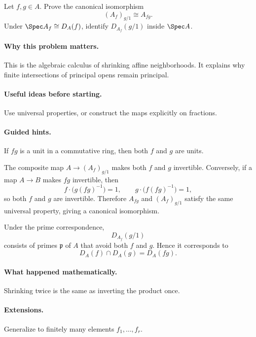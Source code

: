 \begin{problem}
Let $f,g\in A$.  Prove the canonical isomorphism
\[
(A_f)_{g/1}\cong A_{fg}.
\]
Under $\Spec A_f\cong D_A(f)$, identify $D_{A_f}(g/1)$ inside $\Spec A$.
\end{problem}

\paragraph{Why this problem matters.}
This is the algebraic calculus of shrinking affine neighborhoods.  It explains why finite
intersections of principal opens remain principal.

\paragraph{Useful ideas before starting.}
Use universal properties, or construct the maps explicitly on fractions.

\paragraph{Guided hints.}
If $fg$ is a unit in a commutative ring, then both $f$ and $g$ are units.

\begin{solution}
The composite map $A\to(A_f)_{g/1}$ makes both $f$ and $g$ invertible.  Conversely, if a
map $A\to B$ makes $fg$ invertible, then
\[
f\cdot\bigl(g(fg)^{-1}\bigr)=1,
\qquad
g\cdot\bigl(f(fg)^{-1}\bigr)=1,
\]
so both $f$ and $g$ are invertible.  Therefore $A_{fg}$ and $(A_f)_{g/1}$ satisfy the same
universal property, giving a canonical isomorphism.

Under the prime correspondence,
\[
D_{A_f}(g/1)
\]
consists of primes $\mathfrak p$ of $A$ that avoid both $f$ and $g$.  Hence it corresponds
to
\[
D_A(f)\cap D_A(g)=D_A(fg).
\]
\end{solution}

\paragraph{What happened mathematically.}
Shrinking twice is the same as inverting the product once.

\paragraph{Extensions.}
Generalize to finitely many elements $f_1,\dots,f_r$.
